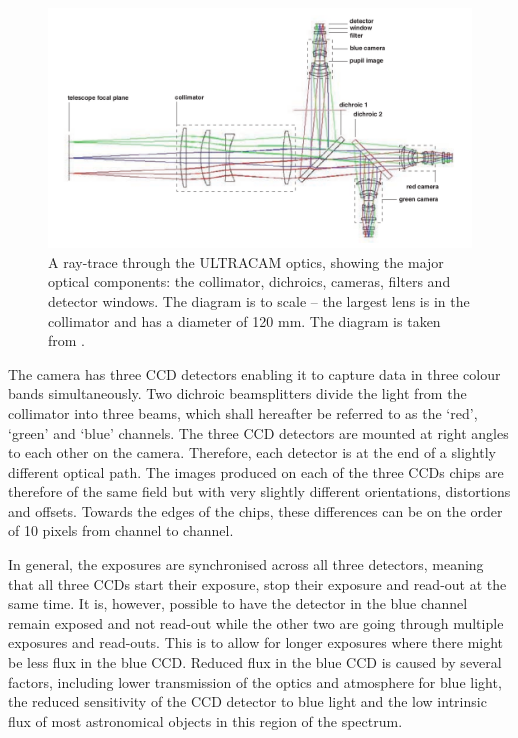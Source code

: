 \begin{figure}
\centering
\includegraphics[width=120mm]{images/ucamoptics.png}
\caption{A ray-trace through the ULTRACAM optics, showing the major optical components: the collimator, dichroics, cameras, filters and detector windows. The diagram is to scale – the largest lens is in the collimator and has a diameter of 120 mm. The diagram is taken from \citet{dhillon07}.}
\label{fig:optics}
\end{figure}

The camera has three CCD detectors enabling it to capture data in three colour bands simultaneously. Two dichroic beamsplitters divide the light from the collimator into three beams, which shall hereafter be referred to as the `red', `green' and `blue' channels. The three CCD detectors are mounted at right angles to each other on the camera. Therefore, each detector is at the end of a slightly different optical path. The images produced on each of the three CCDs chips are therefore of the same field but with very slightly different orientations, distortions and offsets. Towards the edges of the chips, these differences can be on the order of 10 pixels from channel to channel. 

In general, the exposures are synchronised across all three detectors, meaning that all three CCDs start their exposure, stop their exposure and read-out at the same time. It is, however, possible to have the detector in the blue channel remain exposed and not read-out while the other two are going through multiple exposures and read-outs. This is to allow for longer exposures where there might be less flux in the blue CCD. Reduced flux in the blue CCD is caused by several factors, including lower transmission of the optics and atmosphere for blue light, the reduced sensitivity of the CCD detector to blue light and the low intrinsic flux of most astronomical objects in this region of the spectrum.

